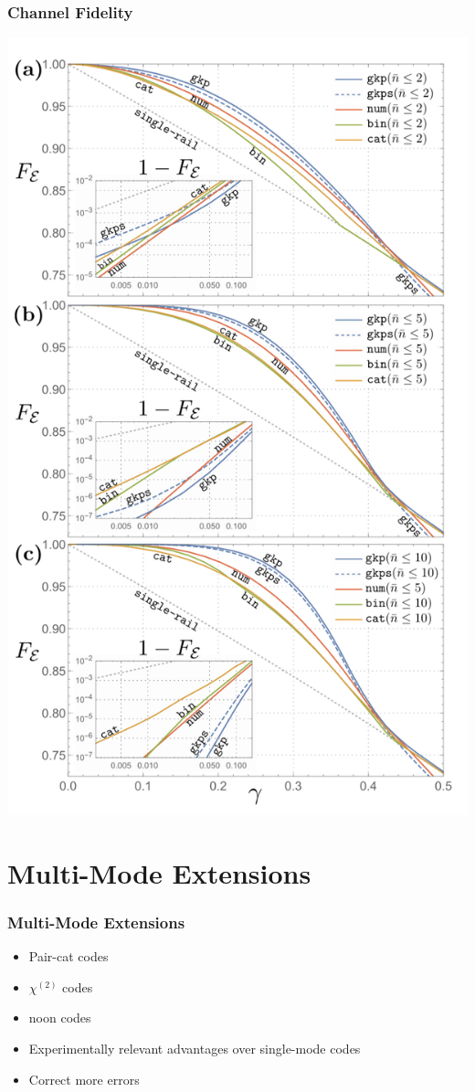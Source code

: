 \documentclass{beamer}
\newcommand\0{\mathbf{0}}
\begin{document}
\begin{frame}
\frametitle{Channel Fidelity}
\includegraphics[width=\linewidth,height=0.9\textheight,keepaspectratio]{fidelity.png}
\end{frame}


\section{Multi-Mode Extensions}

\begin{frame}
\frametitle{Multi-Mode Extensions}
\begin{itemize}
\item Pair-cat codes
\item $\chi^{(2)}$ codes
\item noon codes
\item Experimentally relevant advantages over single-mode codes 
\item Correct more errors
\end{itemize}
\end{frame}
\end{document}
